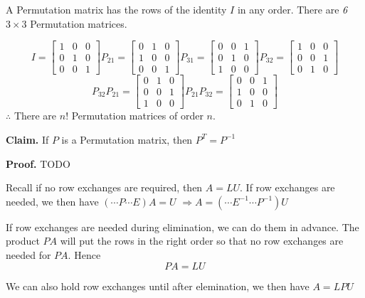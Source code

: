 \documentclass[12pt,a4paper]{article}
\begin{document}
A Permutation matrix has the rows of the identity $I$ in any order. 
There are \textit{6} $3 \times 3$ Permutation matrices.

\[
  I = 
  \begin{bmatrix}
    1 & 0 & 0 \\
    0 & 1 & 0 \\
    0 & 0 & 1
  \end{bmatrix}
  P_{21} = 
  \begin{bmatrix}
    0 & 1 & 0 \\
    1 & 0 & 0 \\
    0 & 0 & 1
  \end{bmatrix}
  P_{31} =
  \begin{bmatrix}
    0 & 0 & 1 \\
    0 & 1 & 0 \\
    1 & 0 & 0
  \end{bmatrix}
  P_{32} =
  \begin{bmatrix}
    1 & 0 & 0 \\
    0 & 0 & 1 \\
    0 & 1 & 0
  \end{bmatrix}
\]
\[
  P_{32}P_{21} = 
  \begin{bmatrix}
    0 & 1 & 0 \\
    0 & 0 & 1 \\
    1 & 0 & 0
  \end{bmatrix}
  P_{21}P_{32} =
  \begin{bmatrix}
    0 & 0 & 1 \\
    1 & 0 & 0 \\
    0 & 1 & 0
  \end{bmatrix}
\]
$\therefore$ There are $n!$ Permutation matrices of order $n$.

\textbf{Claim.} If $P$ is a Permutation matrix, then $P^T = P^{-1}$

\textbf{Proof.} TODO

Recall if no row exchanges are required, then $A = LU$.
If row exchanges are needed, we then have $(\cdots P \cdots E)A = U$
$\Rightarrow A = (\cdots E^{-1} \cdots P^{-1})U$

If row exchanges are needed during elimination, we can do them in advance.
The product $PA$ will put the rows in the right order so that no row exchanges are needed for $PA$.
Hence $$PA = LU$$

We can also hold row exchanges until after elemination, we then have $A = LPU$
\end{document}
